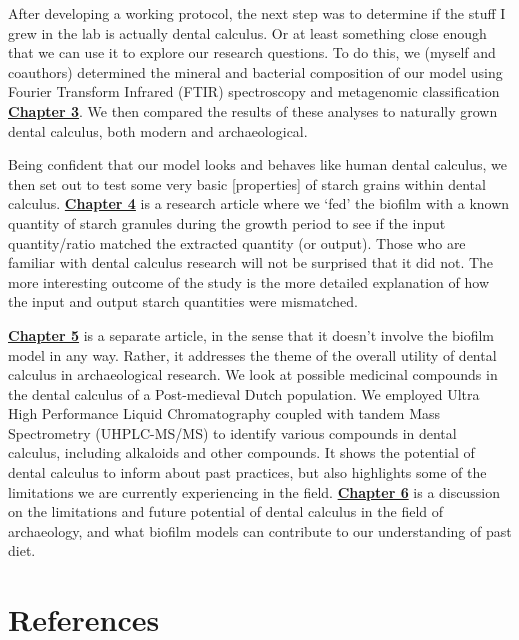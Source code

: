 \documentclass[
  letterpaper,
]{book}
\begin{document}
After developing a working protocol, the next step was to determine if
the stuff I grew in the lab is actually dental calculus. Or at least
something close enough that we can use it to explore our research
questions. To do this, we (myself and coauthors) determined the mineral
and bacterial composition of our model using Fourier Transform Infrared
(FTIR) spectroscopy and metagenomic classification
\protect\hyperlink{byoc-valid}{\textbf{Chapter 3}}. We then compared the
results of these analyses to naturally grown dental calculus, both
modern and archaeological.

Being confident that our model looks and behaves like human dental
calculus, we then set out to test some very basic {[}properties{]} of
starch grains within dental calculus.
\protect\hyperlink{byoc-starch}{\textbf{Chapter 4}} is a research
article where we `fed' the biofilm with a known quantity of starch
granules during the growth period to see if the input quantity/ratio
matched the extracted quantity (or output). Those who are familiar with
dental calculus research will not be surprised that it did not. The more
interesting outcome of the study is the more detailed explanation of how
the input and output starch quantities were mismatched.

\protect\hyperlink{mb11CalculusPilot}{\textbf{Chapter 5}} is a separate
article, in the sense that it doesn't involve the biofilm model in any
way. Rather, it addresses the theme of the overall utility of dental
calculus in archaeological research. We look at possible medicinal
compounds in the dental calculus of a Post-medieval Dutch population. We
employed Ultra High Performance Liquid Chromatography coupled with
tandem Mass Spectrometry (UHPLC-MS/MS) to identify various compounds in
dental calculus, including alkaloids and other compounds. It shows the
potential of dental calculus to inform about past practices, but also
highlights some of the limitations we are currently experiencing in the
field. \protect\hyperlink{chap-discussion}{\textbf{Chapter 6}} is a
discussion on the limitations and future potential of dental calculus in
the field of archaeology, and what biofilm models can contribute to our
understanding of past diet.

\hypertarget{references}{%
\section*{References}\label{references}}

\end{document}
